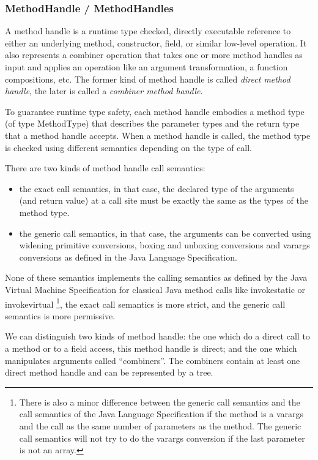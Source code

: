 \documentclass{sig-alternate}
\begin{document}
    \subsubsection{MethodHandle / MethodHandles}
      \label{MH}

      A method handle is a runtime type checked, directly executable reference to
      either an underlying method, constructor, field, or similar low-level operation.
      It also represents a combiner operation that takes one or more method handles as input and
      applies an operation like an argument transformation, a function compositions, etc.
      The former kind of method handle is called {\it direct method handle},
      the later is called a {\it combiner method handle}.

      To guarantee runtime type safety, each method handle embodies a method type (of type MethodType)
      that describes the parameter types and the return type that a method handle accepts.
      When a method handle is called, the method type is checked using different semantics depending on the
      type of call.

      There are two kinds of method handle call semantics:
      \begin{itemize}
        \item the exact call semantics, in that case, the declared type of the arguments (and return value) at a call site
              must be exactly the same as the types of the method type.
        \item the generic call semantics, in that case, the arguments can be converted using widening primitive conversions,
              boxing and unboxing conversions and varargs conversions as defined in the Java Language Specification.
      \end{itemize}
      None of these semantics implements the calling semantics as defined by the Java Virtual Machine Specification
      for classical Java method calls like invokestatic or invokevirtual
      \footnote{There is also a minor difference between the generic call semantics and the call semantics of
        the Java Language Specification if the method is a varargs and the call as the same number of parameters as the method.
        The generic call semantics will not try to do the varargs conversion if the last parameter is not an array.},
      the exact call semantics is more strict, and the generic call semantics is more permissive.

      We can distinguish two kinds of method handle:
      the one which do a direct call to a method or to a field access, this method handle is direct;
      and the one which manipulates arguments called ``combiners''.
      The combiners contain at least one direct method handle and can be represented by a tree.
\end{document}
